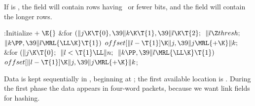 If  is , the  field will
contain rows having
~or fewer bits, and the  field will contain the longer
rows.

\fi

\B{}:Initialize\X${}\mathrel+\E{}$\6
\&{for} ${}(\|j\K\T{0},\39\|k\K\T{1},\39\|l\K\T{2};{}$ ${}\|l\Z\\{thresh};{}$
${}\|k\PP,\39\|l\MRL{{\LL}{\K}}\T{1}){}$\1\5
${}\\{offset}[\|l-\T{1}]\K\|j,\39\|j\MRL{+{\K}}\|k;{}$\2\6
\&{for} ${}(\|j\K\T{0};{}$ ${}\|l<\T{1}\LL\|n;{}$ ${}\|k\PP,\39\|l\MRL{{\LL}{%
\K}}\T{1}){}$\1\5
${}\\{offset}[\|l-\T{1}]\K\|j,\39\|j\MRL{+{\K}}\|k{}$;\2\par
\fi

Data is kept sequentially in , beginning at ;
the first
available location is . During the first phase the data appears
in four-word packets, because we want link fields for hashing.

